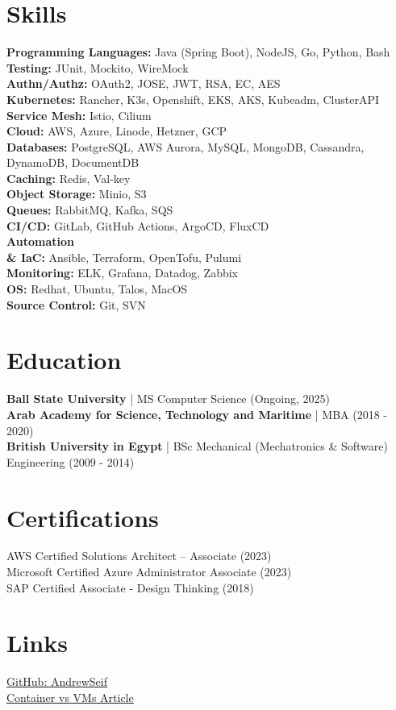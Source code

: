 \documentclass[a4paper,10pt]{article}
\begin{document}
\section*{Skills}
\textbf{Programming Languages:} Java (Spring Boot), NodeJS, Go, Python, Bash\\
\textbf{Testing:} JUnit, Mockito, WireMock\\
\textbf{Authn/Authz:} OAuth2, JOSE, JWT, RSA, EC, AES\\
\textbf{Kubernetes:} Rancher, K3s, Openshift, EKS, AKS, Kubeadm, ClusterAPI\\
\textbf{Service Mesh:} Istio, Cilium\\
\textbf{Cloud:} AWS, Azure, Linode, Hetzner, GCP\\
\textbf{Databases:} PostgreSQL, AWS Aurora, MySQL, MongoDB, Cassandra, DynamoDB, DocumentDB\\
\textbf{Caching:} Redis, Val-key\\
\textbf{Object Storage:} Minio, S3\\
\textbf{Queues:} RabbitMQ, Kafka, SQS\\
\textbf{CI/CD:} GitLab, GitHub Actions, ArgoCD, FluxCD\\
\textbf{Automation \\& IaC:} Ansible, Terraform, OpenTofu, Pulumi\\
\textbf{Monitoring:} ELK, Grafana, Datadog, Zabbix\\
\textbf{OS:} Redhat, Ubuntu, Talos, MacOS\\
\textbf{Source Control:} Git, SVN

\section*{Education}
\textbf{Ball State University} | MS Computer Science (Ongoing, 2025)\\
\textbf{Arab Academy for Science, Technology and Maritime} | MBA (2018 - 2020)\\
\textbf{British University in Egypt} | BSc Mechanical (Mechatronics & Software) Engineering (2009 - 2014)

\section*{Certifications}
AWS Certified Solutions Architect – Associate (2023)\\
Microsoft Certified Azure Administrator Associate (2023)\\
SAP Certified Associate - Design Thinking (2018)

\section*{Links}
\href{https://github.com/AndrewSeif}{GitHub: AndrewSeif}\\
\href{https://andrewseif.github.io/Container-vs-VMs/}{Container vs VMs Article}
\end{document}
